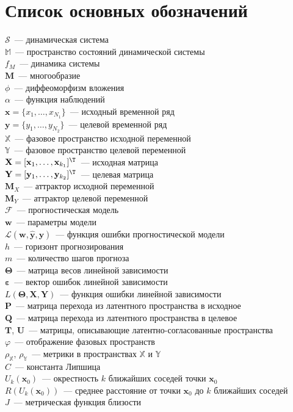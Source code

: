 \documentclass[12pt]{extarticle}
\newcommand{\bw}{\mathbf{w}}
\newcommand{\bx}{\mathbf{x}}
\newcommand{\by}{\mathbf{y}}
\newcommand{\bM}{\mathbf{M}}
\newcommand{\bP}{\mathbf{P}}
\newcommand{\bQ}{\mathbf{Q}}
\newcommand{\bX}{\mathbf{X}}
\newcommand{\bY}{\mathbf{Y}}
\begin{document}
\section*{Список основных обозначений}
\noindent 
$\mathcal{S}$~--- динамическая система\\
$\mathbb{M}$~--- пространство состояний динамической системы\\
$f_M$~--- динамика системы\\
$\bM$~--- многообразие\\
$\phi$~--- диффеоморфизм вложения\\
$\alpha$~--- функция наблюдений\\
$\bx = \{ x_1,\dots, x_{N_1}\}$~--- исходный временной ряд\\
$\by = \{ y_1,\dots, y_{N_2}\}$~--- целевой временной ряд\\
$\mathbb{X}$~--- фазовое пространство исходной переменной \\
$\mathbb{Y}$~--- фазовое пространство целевой переменной \\
$\mathbf{X} = [\bx_1, \dots, \bx_{k_1}]^{\T} $~--- исходная матрица \\
$\mathbf{Y} = [\by_1, \dots, \by_{k_2}]^{\T} $~--- целевая матрица  \\
$\bM_X$~--- аттрактор исходной переменной\\
$\bM_Y$~--- аттрактор целевой переменной\\
$\mathcal{F}$~--- прогностическая модель \\
$\bw$~--- параметры модели \\
$\mathcal{L}(\bw, \widehat{\by}, \by)$~--- функция ошибки прогностической модели \\
$h$~--- горизонт прогнозирования\\
$m$~--- количество шагов прогноза\\
$\mathbf{\Theta}$~--- матрица весов линейной зависимости\\
$\boldsymbol{\varepsilon}$~--- вектор ошибок линейной зависимости\\
$L(\mathbf{\Theta}, \bX, \bY)$~--- функция ошибки линейной зависимости\\
$\bP$~--- матрица перехода из латентного пространства в исходное\\
$\bQ$~--- матрица перехода из латентного пространства в целевое\\
$\mathbf{T}$, $\mathbf{U}$~--- матрицы, описывающие латентно-согласованные пространства \\
$\varphi$~--- отображение фазовых пространств\\
$\rho_{\mathbb{X}},\, \rho_{\mathbb{Y}}$~--- метрики в пространствах $\mathbb{X}$ и $\mathbb{Y}$\\
$C$~--- константа Липшица\\
$U_k(\bx_0)$~--- окрестность $k$ ближайших соседей точки $\bx_0$\\
$R(U_k(\bx_0))$~--- среднее расстояние от точки $\bx_0$ до $k$ ближайших соседей\\
$J$~---  метрическая функция близости
\end{document}
